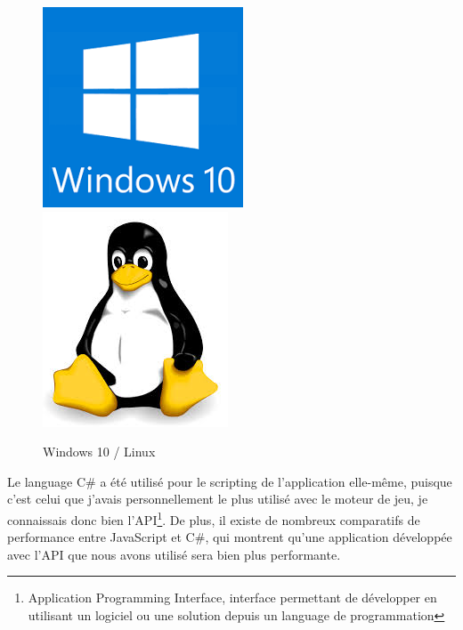 \documentclass[a4paper]{article}
\begin{document}
    \begin{figure}[H]
        \centering
        \includegraphics[scale=0.5]{img/logo-w10}
        \hspace{10pt}
        \includegraphics[scale=0.5]{img/logo-linux}
        \caption{Windows 10 / Linux}
    \end{figure}
    
    \newpage

    Le language C\# a été utilisé pour le scripting de l'application elle-même, puisque c'est celui que j'avais personnellement le plus utilisé avec le moteur de jeu, je connaissais donc bien l'API\footnote{Application Programming Interface, interface permettant de développer en utilisant un logiciel ou une solution depuis un language de programmation}. De plus, il existe de nombreux comparatifs de performance entre JavaScript et C\#, qui montrent qu'une application développée avec l'API que nous avons utilisé sera bien plus performante. \\
\end{document}
